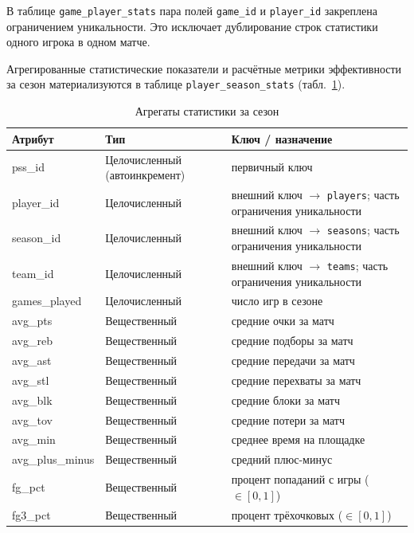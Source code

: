 В таблице \texttt{game\_player\_stats} пара полей \texttt{game\_id} и
\texttt{player\_id} закреплена ограничением уникальности. Это исключает
дублирование строк статистики одного игрока в одном матче.

{\footnotesize\setlength{\tabcolsep}{4pt}\renewcommand{\arraystretch}{1.12}%

{\normalsize
Агрегированные статистические показатели и расчётные метрики эффективности за
сезон материализуются в таблице \texttt{player\_season\_stats}
(табл.~\ref{tab:pss}).
}

\begin{table}[H]
\caption{Агрегаты статистики за сезон}
\label{tab:pss}
\centering
\begin{tabular}{|p{}|p{}|p{}|}
\hline
\textbf{Атрибут} & \textbf{Тип} & \textbf{Ключ / назначение} \\
\hline
pss\_id & Целочисленный (автоинкремент) & первичный ключ \\
\hline
player\_id & Целочисленный & внешний ключ $\rightarrow$ \texttt{players}; часть ограничения уникальности \\
\hline
season\_id & Целочисленный & внешний ключ $\rightarrow$ \texttt{seasons}; часть ограничения уникальности \\
\hline
team\_id & Целочисленный & внешний ключ $\rightarrow$ \texttt{teams}; часть ограничения уникальности \\
\hline
games\_played & Целочисленный & число игр в сезоне \\
\hline
avg\_pts & Вещественный & средние очки за матч \\
\hline
avg\_reb & Вещественный & средние подборы за матч \\
\hline
avg\_ast & Вещественный & средние передачи за матч \\
\hline
avg\_stl & Вещественный & средние перехваты за матч \\
\hline
avg\_blk & Вещественный & средние блоки за матч \\
\hline
avg\_tov & Вещественный & средние потери за матч \\
\hline
avg\_min & Вещественный & среднее время на площадке \\
\hline
avg\_plus\_minus & Вещественный & средний плюс-минус \\
\hline
fg\_pct & Вещественный & процент попаданий с игры ($\in [0,1]$) \\
\hline
fg3\_pct & Вещественный & процент трёхочковых ($\in [0,1]$) \\

\end{tabular}
\end{table}}
